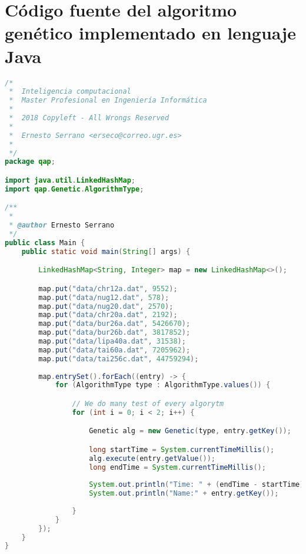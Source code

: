 \section{Código fuente del algoritmo genético implementado en lenguaje Java}
\begin{lstlisting}[language=java,caption={Main.java},captionpos=b]
/*  
 *  Inteligencia computacional
 *  Master Profesional en Ingeniería Informática
 * 
 *  2018 Copyleft - All Wrongs Reserved
 *
 *  Ernesto Serrano <erseco@correo.ugr.es>
 * 
 */
package qap;

import java.util.LinkedHashMap;
import qap.Genetic.AlgorithmType;

/**
 * 
 * @author Ernesto Serrano
 */
public class Main {
    public static void main(String[] args) {

        LinkedHashMap<String, Integer> map = new LinkedHashMap<>();

        map.put("data/chr12a.dat", 9552);
        map.put("data/nug12.dat", 578);
        map.put("data/nug20.dat", 2570);
        map.put("data/chr20a.dat", 2192);
        map.put("data/bur26a.dat", 5426670);
        map.put("data/bur26b.dat", 3817852);
        map.put("data/lipa40a.dat", 31538);
        map.put("data/tai60a.dat", 7205962);
        map.put("data/tai256c.dat", 44759294);        
        
        map.entrySet().forEach((entry) -> {
            for (AlgorithmType type : AlgorithmType.values()) {

                // We do many test of every algorytm
                for (int i = 0; i < 2; i++) {

                    Genetic alg = new Genetic(type, entry.getKey());

                    long startTime = System.currentTimeMillis();
                    alg.execute(entry.getValue());
                    long endTime = System.currentTimeMillis();
                    
                    System.out.println("Time: " + (endTime - startTime) / 1000);
                    System.out.println("Name:" + entry.getKey());
                    
                }
            }
        }); 
    }
}
\end{lstlisting}
